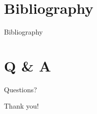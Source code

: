 \documentclass{beamer}
\begin{document}
\section{Bibliography}
\begin{frame}[allowframebreaks]{Bibliography}
    \tiny{\printbibliography}
\end{frame}


\section{Q \& A}
\begin{frame}
    \Huge{Questions?}
\end{frame}
\begin{frame}
    \Huge{Thank you!}
\end{frame}
\end{document}

